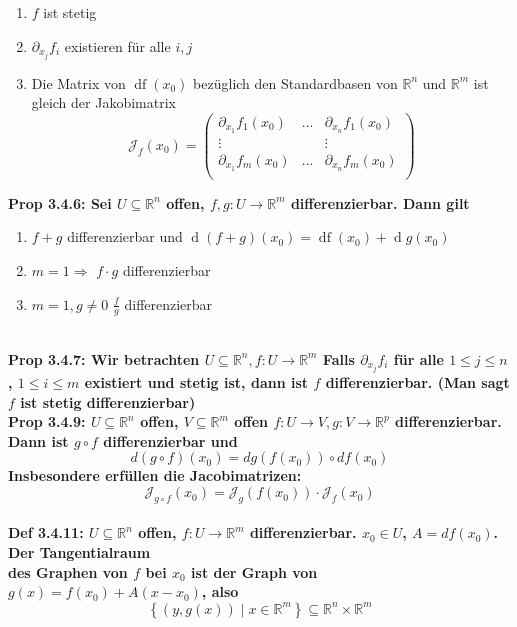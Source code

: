 \documentclass[7pt,landscape, margin = 0.1mm]{article}
\newcommand{\COL}[1]{ \color{chaptercolor} \bf{#1}\color{black}     \\}
\newcommand{\DEF}[2]{\color{chaptercolor}\bf{Def #1}:\color{black}    \hspace{0.2cm} #2 \\}
\newcommand{\PROP}[2]{\color{chaptercolor}\bf{Prop #1}:\color{black}    \hspace{0.2cm} #2 \\}
\begin{document}
\begin{multicols}{4}
\begin{flushleft}
{\begin{enumerate}
\item $f$ ist stetig
\item $\partial_{x_{j}}f_{i}$ existieren für alle $i,j$
\item Die Matrix von $\operatorname{df}\left(x_{0} \right)$ bezüglich den Standardbasen von  $\mathbb{R}^{n}$ und $\mathbb{R}^{m}$ ist gleich der Jakobimatrix $$\mathcal{J}_f (x_0 )=\begin{pmatrix}
\partial_{x_1}f_1(x_0) &  \ldots & \partial_{x_n}f_1(x_0)  \\
 \vdots &  &  \vdots \\
\partial_{x_1}f_m(x_0)  & \ldots & \partial_{x_n}f_m(x_0)  \\
\end{pmatrix}$$
\end{enumerate}

}

\PROP{3.4.6}{Sei $U \subseteq \mathbb{R}^{n}$ offen, $f,g: U \longrightarrow \mathbb{R}^{m}$ differenzierbar. Dann gilt 
\begin{enumerate}


\item $f+g$ differenzierbar und $\operatorname{d}(f+g)(x_{0})=\operatorname{df}(x_{0})+ \operatorname{d}g(x_{0})$
\item $m=1 \Rightarrow$ $f\cdot g$ differenzierbar
\item $m=1, g\neq 0$ $\frac{f}{g}$ differenzierbar
 \end{enumerate}}
 
 \PROP{3.4.7}{Wir betrachten $U \subseteq \mathbb{R}^{n}, f: U \to \mathbb{R}^{m}$
Falls $\partial_{x_{j}}f_{i}$ für alle $1\leq j\leq n$, $1\leq i \leq m$ existiert und stetig ist, dann ist $f$ differenzierbar. (Man sagt $f$ ist stetig differenzierbar)}

\PROP{3.4.9}{$U \subseteq \mathbb{R}^{n}$ offen, $V \subseteq \mathbb{R}^{m}$ offen
 $f: U \longrightarrow V, g: V \longrightarrow \mathbb{R}^{p}$ differenzierbar. Dann ist $g \circ f$ differenzierbar  und
 $$d(g\circ f)(x_{0})= dg(f(x_{0}))\circ df(x_{0})$$ Insbesondere erfüllen die Jacobimatrizen:
  $$
  \mathcal{J}_{g \circ f} (x_{0})=\mathcal{J}_{g} (f(x_{0})) \cdot \mathcal{J}_{f} (x_{0})
  $$}


\DEF{3.4.11}{$U \subseteq \mathbb{R}^{n}$ offen, $f: U \to \mathbb{R}^{m}$ differenzierbar.
 $x_{0} \in U$, $A = df(x_{0})$. Der \COL{Tangentialraum} des Graphen von $f$ bei $x_{0}$ ist der Graph von $g(x)=f(x_{0})+A(x-x_{0})$, also 
 $$ \left\{ \left(y,g(x) \right) \mid x \in \mathbb{R}^{m} \right\} \subseteq \mathbb{R}^{n}\times \mathbb{R}^{m} $$}


\end{flushleft}
\end{multicols}
\end{document}
